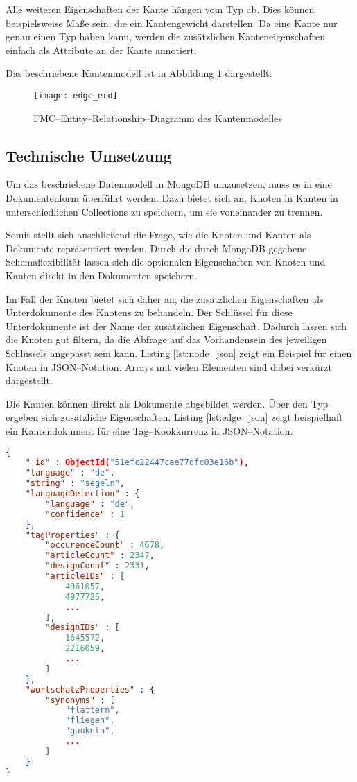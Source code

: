 Alle weiteren Eigenschaften der Kante hängen vom Typ ab. Dies können beispielsweise Maße sein, die ein Kantengewicht darstellen. Da eine Kante nur genau einen Typ haben kann, werden die zusätzlichen Kanteneigenschaften einfach als Attribute an der Kante annotiert.

Das beschriebene Kantenmodell ist in Abbildung \ref{fig:edge_erd} dargestellt.

\begin{figure}
\centering
\texttt{[image: edge\_erd]}
\caption{FMC--Entity--Relationship--Diagramm des Kantenmodelles}
\label{fig:edge_erd}
\end{figure}

\subsection{Technische Umsetzung}

Um das beschriebene Datenmodell in MongoDB umzusetzen, muss es in eine Dokumentenform überführt werden. Dazu bietet sich an, Knoten in Kanten in unterschiedlichen Collections zu speichern, um sie voneinander zu trennen.

Somit stellt sich anschließend die Frage, wie die Knoten und Kanten als Dokumente repräsentiert werden. Durch die durch MongoDB gegebene Schemaflexibilität lassen sich die optionalen Eigenschaften von Knoten und Kanten direkt in den Dokumenten speichern.

Im Fall der Knoten bietet sich daher an, die zusätzlichen Eigenschaften als Unterdokumente des Knotens zu behandeln. Der Schlüssel für diese Unterdokumente ist der Name der zusätzlichen Eigenschaft. Dadurch lassen sich die Knoten gut filtern, da die Abfrage auf das Vorhandensein des jeweiligen Schlüssels angepasst sein kann. Listing \ref{lst:node_json} zeigt ein Beispiel für einen Knoten in JSON--Notation. Arrays mit vielen Elementen sind dabei verkürzt dargestellt.

Die Kanten können direkt als Dokumente abgebildet werden. Über den Typ ergeben sich zusätzliche Eigenschaften. Listing \ref{lst:edge_json} zeigt beispielhaft ein Kantendokument für eine Tag--Kookkurrenz in JSON--Notation.

\begin{lstlisting}[language=json, label={lst:node_json}, caption={Knotendokument in JSON}]
{
    "_id" : ObjectId("51efc22447cae77dfc03e16b"),
    "language" : "de",
    "string" : "segeln",
    "languageDetection" : {
        "language" : "de",
        "confidence" : 1
    },
    "tagProperties" : {
        "occurenceCount" : 4678,
        "articleCount" : 2347,
        "designCount" : 2331,
        "articleIDs" : [ 
            4961057, 
            4977725, 
            ...
        ],
        "designIDs" : [ 
            1645572, 
            2216059, 
            ...
        ]
    },
    "wortschatzProperties" : {
        "synonyms" : [ 
            "flattern", 
            "fliegen", 
            "gaukeln", 
            ...
        ]
    }
}
\end{lstlisting}

